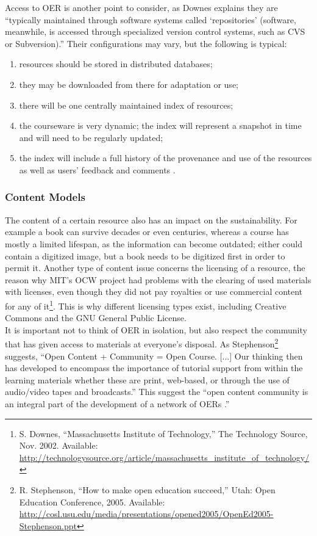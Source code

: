 \documentclass[a4paper]{article}
\begin{document}
\newpage
\noindent
Access to OER is another point to consider, as Downes \cite{sustain} explains they are ``typically maintained through software systems called ‘repositories’ (software, meanwhile, is accessed through specialized version control systems, such as CVS or Subversion).'' Their configurations may vary, but the following is typical:
\begin{enumerate}
\item resources should be stored in distributed databases;
\item they may be downloaded from there for adaptation or use;
\item there will be one centrally maintained index of resources;
\item the courseware is very dynamic; the index will represent a snapshot in time and will need to be regularly updated;
\item the index will include a full history of the provenance and use of the resources as well as users' feedback and comments \cite{open-courseware}.
\end{enumerate}

\subsubsection{Content Models} 

The content of a certain resource also has an impact on the sustainability. For example a book can survive decades or even centuries, whereas a course has mostly a limited lifespan, as the information can become outdated; either could contain a digitized image, but a book needs to be digitized first in order to permit it. Another type of content issue concerns the licensing of a resource, the reason why MIT's OCW project had problems with the clearing of used materials with licenses, even though they did not pay royalties or use commercial content for any of it\footnote{S. Downes, ``Massachusetts Institute of Technology,'' The Technology Source, Nov. 2002. Available: \url{http://technologysource.org/article/massachusetts_institute_of_technology/}}. This is why different licensing types exist, including Creative Commons and the GNU General Public License. \\

\noindent
It is important not to think of OER in isolation, but also respect the community that has given access to materials at everyone's disposal. As Stephenson\footnote{R. Stephenson, ``How to make open education succeed,'' Utah: Open Education Conference, 2005. Available: \url{http://cosl.usu.edu/media/presentations/opened2005/OpenEd2005-Stephenson.ppt}} suggests, ``Open Content + Community = Open Course. [...] Our thinking then has developed to encompass the importance of tutorial support from within the learning materials whether these are print, web-based, or through the use of audio/video tapes and broadcasts.'' This suggest the ``open content community is an integral part of the development of a network of OERs \cite[p.39]{sustain}.''
\end{document}

